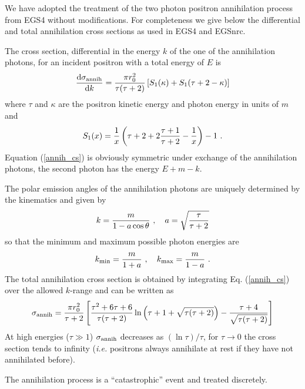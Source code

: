 We have adopted the treatment 
of the two photon positron annihilation process  from 
EGS4 without modifications. For completeness 
we give below the differential and total annihilation 
cross sections as used in EGS4 and EGSnrc.

The cross 
section, differential in the energy $k$ of the one 
of the annihilation photons, for an incident positron with 
a total energy of $E$ is \cite{Ne85}
\begin{equation}
\label{annih_cs}
{{\rm d} \sigma_{\rm annih} \over {\rm d} k} = {\pi r_0^2 \over \tau 
(\tau+2)} \left[ S_1(\kappa) + S_1(\tau + 2 - \kappa) \right]
\end{equation}
where $\tau$ and $\kappa$ are the positron kinetic energy and photon 
energy in units of $m$ and 
\begin{equation}
S_1(x) = \frac{1}{x} \left( \tau + 2 + 2 {\tau + 1 \over \tau + 2} - 
\frac{1}{x} \right) - 1~.
\end{equation}
Equation (\ref{annih_cs}) is obviously symmetric  
under exchange of the annihilation photons, 
the second photon has the energy $E + m - k$.

The polar emission angles of the annihilation photons are uniquely 
determined by the kinematics and given by \cite{Ne85}
\begin{equation}
\label{annih_k_theta}
k = { m \over 1 - a \cos \theta}~, 
\quad a = \sqrt{{\tau \over \tau + 2}}
\end{equation}
so that the minimum and maximum possible photon energies are 
\begin{equation}
\label{annih_kminmax}
k_{\rm min} = {m \over 1 + a} ~, \quad
k_{\rm max} = {m \over 1 - a}~.
\end{equation}
The total annihilation cross section 
is obtained by integrating Eq. (\ref{annih_cs}) 
over the allowed $k$-range and can be written as
\begin{equation}
\sigma_{\rm annih} = {\pi r_0^2 \over \tau + 2} \left[ 
{\tau^2 + 6 \tau + 6 \over \tau (\tau + 2)} \ln\left(\tau + 1 
+ \sqrt{\tau (\tau + 2)} \right) - {\tau + 4 \over \sqrt{\tau (\tau + 2)}} 
\right]
\end{equation}
At high energies ($\tau \gg 1$) $\sigma_{\rm annih}$  
decreases as $(\ln \tau)/\tau$, for $\tau \to 0$ the cross section 
tends to infinity ({\em i.e.} positrons always annihilate at rest 
if they have not annihilated before). 

The annihilation process is a ``catastrophic'' event and 
treated discretely. 

